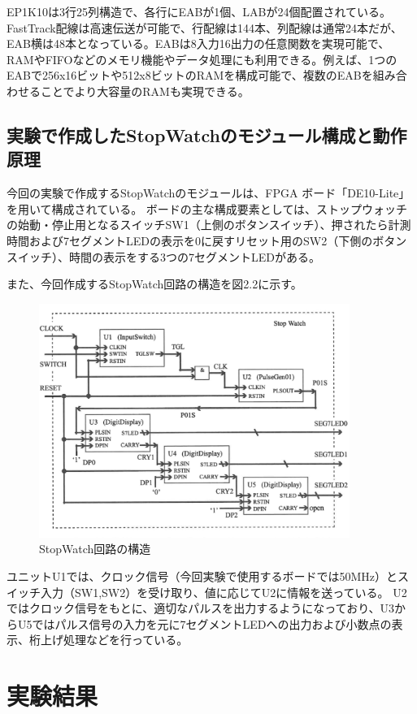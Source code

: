\documentclass{jlreq}
\numberwithin{equation}{section}
\begin{document}
EP1K10は3行25列構造で、各行にEABが1個、LABが24個配置されている。FastTrack配線は高速伝送が可能で、行配線は144本、列配線は通常24本だが、EAB横は48本となっている。EABは8入力16出力の任意関数を実現可能で、RAMやFIFOなどのメモリ機能やデータ処理にも利用できる。例えば、1つのEABで256x16ビットや512x8ビットのRAMを構成可能で、複数のEABを組み合わせることでより大容量のRAMも実現できる。

\subsection{実験で作成したStopWatchのモジュール構成と動作原理}
今回の実験で作成するStopWatchのモジュールは、FPGA ボード「DE10-Lite」を用いて構成されている。
ボードの主な構成要素としては、ストップウォッチの始動・停止用となるスイッチSW1（上側のボタンスイッチ）、押されたら計測時間および7セグメントLEDの表示を0に戻すリセット用のSW2（下側のボタンスイッチ）、時間の表示をする3つの7セグメントLEDがある。

また、今回作成するStopWatch回路の構造を図2.2に示す。

\begin{figure}[H]
  \centering
  \includegraphics[width=0.9\textwidth]{assets/StopWatch_kairo.png}
  \caption{StopWatch回路の構造}
\end{figure}

ユニットU1では、クロック信号（今回実験で使用するボードでは50MHz）とスイッチ入力（SW1,SW2）を受け取り、値に応じてU2に情報を送っている。
U2ではクロック信号をもとに、適切なパルスを出力するようになっており、U3からU5ではパルス信号の入力を元に7セグメントLEDへの出力および小数点の表示、桁上げ処理などを行っている。

\section{実験結果}
\end{document}
